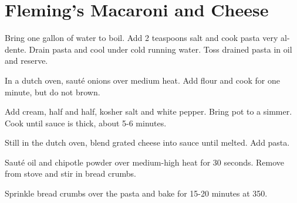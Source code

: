 
\section{Fleming's Macaroni and Cheese}
\begin{recipe}



Bring one gallon of water to boil. Add 2 teaspoons salt and cook pasta very al-dente. Drain pasta and cool under cold running water. Toss drained pasta in oil and reserve.


In a dutch oven, sauté onions over medium heat. Add flour and cook for one minute, but do not brown.


Add cream, half and half, kosher salt and white pepper. Bring pot to a simmer. Cook until sauce is thick, about 5-6 minutes.


Still in the dutch oven, blend grated cheese into sauce until melted. Add pasta.


Sauté oil and chipotle powder over medium-high heat for 30 seconds. Remove from stove and stir in bread crumbs.

Sprinkle bread crumbs over the pasta and bake for 15-20 minutes at 350\degree.

\end{recipe}
